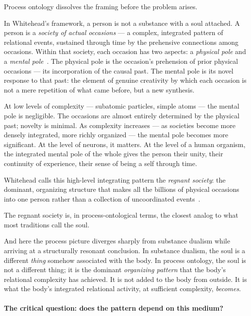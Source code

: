 Process ontology dissolves the framing before the problem arises.

In Whitehead's framework, a person is not a substance with a soul attached.
A person is a \emph{society of actual occasions} --- a complex, integrated
pattern of relational events, sustained through time by the prehensive
connections among occasions.
Within that society, each occasion has two aspects: a \emph{physical pole}
and a \emph{mental pole}~\citeyearpar{Whitehead1929}.
The physical pole is the occasion's prehension of prior physical occasions ---
its incorporation of the causal past.
The mental pole is its novel response to that past: the element of genuine
creativity by which each occasion is not a mere repetition of what came
before, but a new synthesis.

At low levels of complexity --- subatomic particles, simple atoms ---
the mental pole is negligible.
The occasions are almost entirely determined by the physical past; novelty
is minimal.
As complexity increases --- as societies become more densely integrated,
more richly organized --- the mental pole becomes more significant.
At the level of neurons, it matters.
At the level of a human organism, the integrated mental pole of the whole
gives the person their unity, their continuity of experience, their sense
of being a self through time.

Whitehead calls this high-level integrating pattern the \emph{regnant
society}: the dominant, organizing structure that makes all the billions
of physical occasions into one person rather than a collection of
uncoordinated events~\citeyearpar{Whitehead1929,Whitehead1933}.

The regnant society is, in process-ontological terms, the closest analog
to what most traditions call the soul.

And here the process picture diverges sharply from substance dualism while
arriving at a structurally resonant conclusion.
In substance dualism, the soul is a different \emph{thing} somehow associated
with the body.
In process ontology, the soul is not a different thing; it is the dominant
\emph{organizing pattern} that the body's relational complexity has achieved.
It is not added to the body from outside.
It is what the body's integrated relational activity, at sufficient complexity,
\emph{becomes}.

\paragraph{The critical question: does the pattern depend on this medium?}


